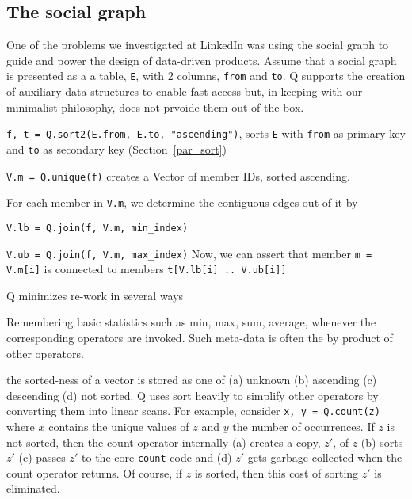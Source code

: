 \subsection{The social graph}
\label{social_graph}

One of the problems we investigated at LinkedIn was using the social graph to
guide and power the design of data-driven products.
Assume that a social graph is presented as a 
a table, {\tt E}, with 2 columns, {\tt from} and {\tt to}. Q supports the
creation of auxiliary data structures to enable fast access but, in keeping with
our minimalist philosophy, does not prvoide them out of the box.
\be
\item {\tt f, t = Q.sort2(E.from, E.to, "ascending")}, sorts {\tt E}
with {\tt from} as primary key and {\tt to} as
secondary key (Section~\ref{par_sort})
\item {\tt V.m = Q.unique(f)} creates a Vector of 
member IDs, sorted ascending. 
\item For each member in {\tt V.m}, we determine the contiguous edges out of it
  by 
  \be
\item {\tt V.lb = Q.join(f, V.m, min\_index)}
\item {\tt V.ub = Q.join(f, V.m, max\_index)}
  \ee
Now, we can assert that member
{\tt m = V.m[i]} is connected to members {\tt t[V.lb[i] .. V.ub[i]]}
\ee

Q minimizes re-work in several ways
\be
\item 
Remembering basic statistics such as min, max, sum, average, whenever the
corresponding operators are invoked. 
Such meta-data is often the by product of other operators.
\item the sorted-ness of a vector is
stored as one of (a) unknown (b) ascending (c) descending (d) not sorted. 
Q
uses sort heavily to simplify other operators by converting them into linear
scans. 
For example, consider {\tt x, y  = Q.count(z)} where \(x\) contains the
unique values of \(z\) and \(y\) the number of occurrences. If \(z\) is not
sorted, then the count operator internally (a) creates a copy, \(z'\), of \(z\)
(b) sorts \(z'\) (c) passes \(z'\) to the core {\tt count} code and (d) \(z'\) gets
garbage collected when the count operator returns. Of course, if \(z\) is
sorted, then this cost of sorting \(z'\) is eliminated.

\ee
